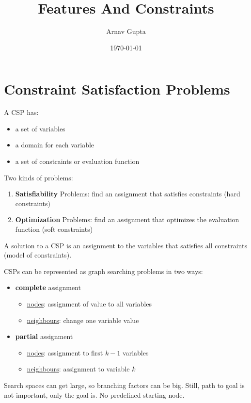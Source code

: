 \documentclass[11pt]{article}
\author{Arnav Gupta}
\date{\today}
\title{Features And Constraints}
\begin{document}
\maketitle
\tableofcontents

\section{Constraint Satisfaction Problems}
\label{sec:orgf2fb812}
A CSP has:
\begin{itemize}
\item a set of variables
\item a domain for each variable
\item a set of constraints or evaluation function
\end{itemize}

Two kinds of problems:
\begin{enumerate}
\item \textbf{Satisfiability} Problems: find an assignment that satisfies constraints (hard constraints)
\item \textbf{Optimization} Problems: find an assignment that optimizes the evaluation function (soft constraints)
\end{enumerate}

A solution to a CSP is an assignment to the variables that satisfies all constraints (model of constraints).

CSPs can be represented as graph searching problems in two ways:
\begin{itemize}
\item \textbf{complete} assignment
\begin{itemize}
\item \uline{nodes}: assignment of value to all variables
\item \uline{neighbours}: change one variable value
\end{itemize}
\item \textbf{partial} assignment
\begin{itemize}
\item \uline{nodes}: assignment to first \(k-1\) variables
\item \uline{neighbours}: assignment to variable \(k\)
\end{itemize}
\end{itemize}

Search spaces can get large, so branching factors can be big.
Still, path to goal is not important, only the goal is.
No predefined starting node.
\end{document}
